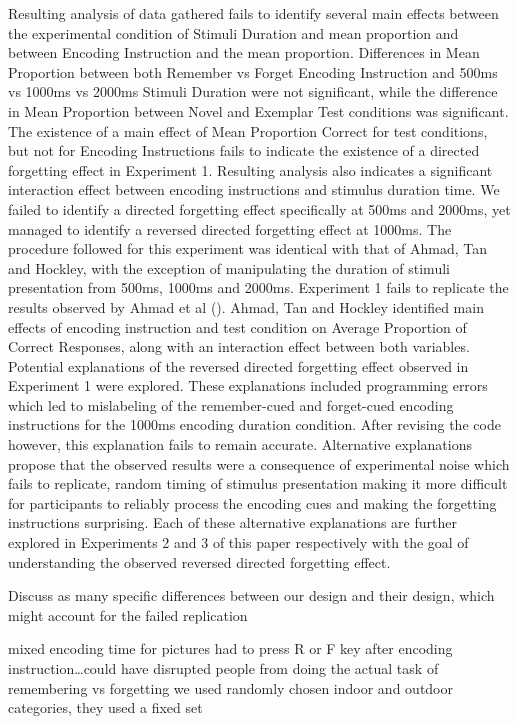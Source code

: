 \documentclass[
  man,floatsintext]{apa6}
\begin{document}
Resulting analysis of data gathered fails to identify several main effects between the experimental condition of Stimuli Duration and mean proportion and between Encoding Instruction and the mean proportion. Differences in Mean Proportion between both Remember vs Forget Encoding Instruction and 500ms vs 1000ms vs 2000ms Stimuli Duration were not significant, while the difference in Mean Proportion between Novel and Exemplar Test conditions was significant. The existence of a main effect of Mean Proportion Correct for test conditions, but not for Encoding Instructions fails to indicate the existence of a directed forgetting effect in Experiment 1. Resulting analysis also indicates a significant interaction effect between encoding instructions and stimulus duration time. We failed to identify a directed forgetting effect specifically at 500ms and 2000ms, yet managed to identify a reversed directed forgetting effect at 1000ms.
The procedure followed for this experiment was identical with that of Ahmad, Tan and Hockley, with the exception of manipulating the duration of stimuli presentation from 500ms, 1000ms and 2000ms. Experiment 1 fails to replicate the results observed by Ahmad et al (). Ahmad, Tan and Hockley identified main effects of encoding instruction and test condition on Average Proportion of Correct Responses, along with an interaction effect between both variables.
Potential explanations of the reversed directed forgetting effect observed in Experiment 1 were explored. These explanations included programming errors which led to mislabeling of the remember-cued and forget-cued encoding instructions for the 1000ms encoding duration condition. After revising the code however, this explanation fails to remain accurate. Alternative explanations propose that the observed results were a consequence of experimental noise which fails to replicate, random timing of stimulus presentation making it more difficult for participants to reliably process the encoding cues and making the forgetting instructions surprising. Each of these alternative explanations are further explored in Experiments 2 and 3 of this paper respectively with the goal of understanding the observed reversed directed forgetting effect.

Discuss as many specific differences between our design and their design, which might account for the failed replication

mixed encoding time for pictures
had to press R or F key after encoding instruction\ldots could have disrupted people from doing the actual task of remembering vs forgetting
we used randomly chosen indoor and outdoor categories, they used a fixed set
\end{document}
